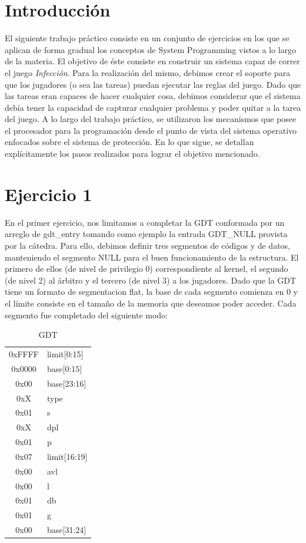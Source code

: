 \documentclass[10pt, a4paper]{article}
\begin{document}
\section{Introducci\'on}
El siguiente trabajo práctico consiste en un conjunto de ejercicios en los que se aplican de forma gradual los conceptos de System Programming vistos a lo largo de la materia. El objetivo de éste consiste en construir un sistema capaz de correr el juego \textit{Infección}. Para la realización del mismo, debimos crear el soporte para que los jugadores (o sea las tareas) puedan ejecutar las reglas del juego. Dado que las tareas eran capaces de hacer cualquier cosa, debimos considerar que el sistema debía tener la capacidad de capturar cualquier problema y poder quitar a la tarea del juego.\newline
A lo largo del trabajo práctico, se utilizaron los mecanismos que posee el procesador para la programación desde el punto de vista del sistema operativo enfocados sobre el sistema de protección. En lo que sigue, se detallan explícitamente los pasos realizados para lograr el objetivo mencionado.

\section{Ejercicio 1}
En el primer ejercicio, nos limitamos a completar la GDT conformada por un arreglo de gdt\_entry tomando como ejemplo la entrada GDT\_NULL provista por la cátedra. Para ello, debimos definir tres segmentos de códigos y de datos, manteniendo el segmento NULL para el buen funcionamiento de la estructura. El primero de ellos (de nivel de privilegio 0) correspondiente al kernel, el segundo (de nivel 2) al árbitro y el tercero (de nivel 3) a los jugadores. Dado que la GDT tiene un formato de segmentacion flat, la base de cada segmento comienza en 0 y el límite consiste en el tamaño de la memoria que deseamos poder acceder. Cada segmento fue completado del siguiente modo:

\begin{table}[H]
\centering
    \begin{tabular}{|c|l|}
        \hline
        0xFFFF & limit[0:15] \\ 
        0x0000 & base[0:15] \\
        0x00 & base[23:16] \\ 
        0xX & type \\ 
        0x01 & s \\ 
        0xX & dpl \\ 
        0x01 & p \\ 
        0x07 & limit[16:19] \\ 
        0x00 & avl \\ 
        0x00 & l \\ 
        0x01 & db \\ 
        0x01 & g \\ 
        0x00 & base[31:24] \\ 
        \hline
    \end{tabular}
    \caption{GDT}
\end{table}
\end{document}
